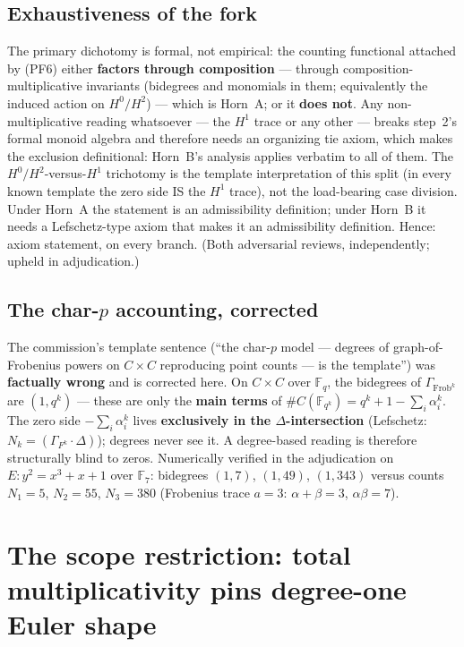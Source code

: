 \documentclass[11pt]{article}
\theoremstyle{plain}
\theoremstyle{definition}
\theoremstyle{remark}
\begin{document}
\subsection{Exhaustiveness of the fork}\label{sec:exhaustive}

The primary dichotomy is formal, not empirical: the counting functional
attached by (PF6) either \textbf{factors through composition} --- through
composition-multiplicative invariants (bidegrees and monomials in them;
equivalently the induced action on $H^0/H^2$) --- which is Horn~A; or it
\textbf{does not}. Any non-multiplicative reading whatsoever --- the $H^1$
trace or any other --- breaks step~2's formal monoid algebra and therefore
needs an organizing tie axiom, which makes the exclusion definitional: Horn~B's
analysis applies verbatim to all of them. The $H^0/H^2$-versus-$H^1$ trichotomy
is the template interpretation of this split (in every known template the zero
side IS the $H^1$ trace), not the load-bearing case division. Under Horn~A the
statement is an admissibility definition; under Horn~B it needs a
Lefschetz-type axiom that makes it an admissibility definition. Hence: axiom
statement, on every branch. (Both adversarial reviews, independently; upheld in
adjudication.)

\subsection{The char-\texorpdfstring{$p$}{p} accounting,
corrected}\label{sec:charp}

The commission's template sentence (``the char-$p$ model --- degrees of
graph-of-Frobenius powers on $C \times C$ reproducing point counts --- is the
template'') was \textbf{factually wrong} and is corrected here. On $C \times C$
over $\mathbb{F}_q$, the bidegrees of $\Gamma_{\mathrm{Frob}^k}$ are
$(1, q^k)$ --- these are only the \textbf{main terms} of
$\#C(\mathbb{F}_{q^k}) = q^k + 1 - \sum_i \alpha_i^k$. The zero side
$-\sum_i \alpha_i^k$ lives \textbf{exclusively in the $\Delta$-intersection}
(Lefschetz: $N_k = (\Gamma_{F^k} \cdot \Delta)$); degrees never see it. A
degree-based reading is therefore structurally blind to zeros. Numerically
verified in the adjudication on $E \colon y^2 = x^3 + x + 1$ over
$\mathbb{F}_7$: bidegrees $(1, 7)$, $(1, 49)$, $(1, 343)$ versus counts
$N_1 = 5$, $N_2 = 55$, $N_3 = 380$ (Frobenius trace $a = 3$:
$\alpha + \beta = 3$, $\alpha\beta = 7$).

\section{The scope restriction: total multiplicativity pins degree-one Euler
shape}\label{sec:scope}
\end{document}
